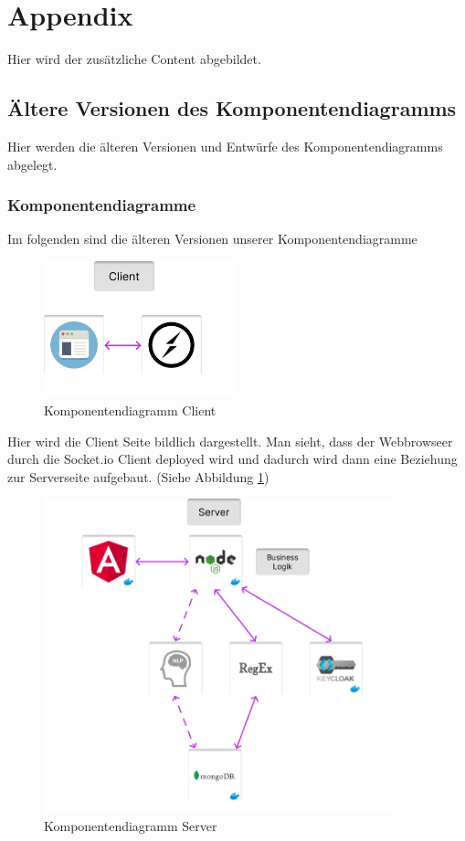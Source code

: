 \section{Appendix}
Hier wird der zusätzliche Content abgebildet.

\subsection{Ältere Versionen des Komponentendiagramms}
Hier werden die älteren Versionen und Entwürfe des Komponentendiagramms abgelegt.

\subsubsection{Komponentendiagramme}
Im folgenden sind die älteren Versionen unserer Komponentendiagramme

\begin{figure}[H]
\centering
\includegraphics[width=0.5\textwidth]{bilder/technologien/KomponentendiagramClient.png}
\caption{Komponentendiagramm Client}
\label{fig:Komponentendiagramm_Client}
\end{figure}
\noindent Hier wird die Client Seite bildlich dargestellt. Man sieht, dass der Webbrowseer durch die 
Socket.io Client deployed wird und dadurch wird dann eine Beziehung zur Serverseite aufgebaut. (Siehe Abbildung \ref{fig:Komponentendiagramm_Client})

\begin{figure}[H]
\centering
\includegraphics[width=0.9\textwidth]{bilder/technologien/KomponentendiagramServer.png}
\caption{Komponentendiagramm Server}
\label{fig:Komponentendiagramm_Server}
\end{figure}

